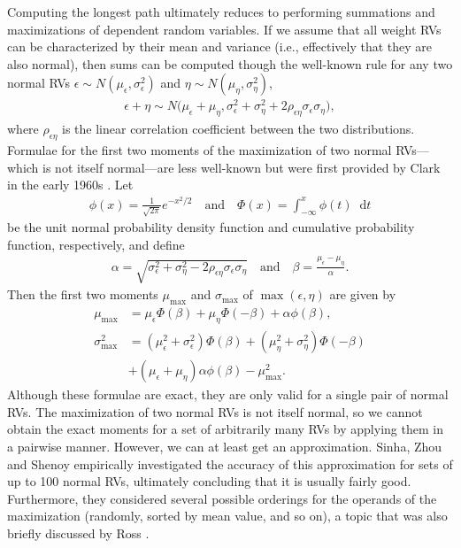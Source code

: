 \documentclass[12pt]{article}
\def\diff{\mathop{}\!\mathrm{d}}
\begin{document}
Computing the longest path ultimately reduces to performing summations and maximizations of dependent random variables. If we assume that all weight RVs can be characterized by their mean and variance (i.e., effectively that they are also normal), then sums can be computed though the well-known rule for any two normal RVs $\epsilon \sim N(\mu_\epsilon, \sigma_\epsilon^2)$ and $\eta \sim N(\mu_\eta, \sigma_\eta^2)$,
\begin{align}
\label{eq.sum_moments}
\epsilon + \eta \sim N \big(\mu_\epsilon + \mu_\eta, \sigma_\epsilon^2 + \sigma_\eta^2 + 2 \rho_{\epsilon\eta}\sigma_\epsilon \sigma_\eta \big), 
\end{align}
where $\rho_{\epsilon\eta}$ is the linear correlation coefficient between the two distributions. Formulae for the first two moments of the maximization of two normal RVs---which is not itself normal---are less well-known but were first provided by Clark in the early 1960s \cite{cla61}. Let 
\begin{align*}
\phi(x) = \frac{1}{\sqrt{2\pi}} e^{-x^2/2} \quad \text{and} \quad \Phi(x) = \int_{-\infty}^{x} \phi(t) \diff t
\end{align*}
be the unit normal probability density function and cumulative probability function, respectively, and define 
\begin{align}
  \label{eq.alpha_beta}
\alpha = \sqrt{\sigma_\epsilon^2 + \sigma_\eta^2 - 2 \rho_{\epsilon\eta}\sigma_\epsilon \sigma_\eta} \quad \text{and} \quad \beta = \frac{\mu_\epsilon - \mu_\eta}{\alpha}. 
\end{align}
Then the first two moments $\mu_{\max}$ and $\sigma_{\max}$ of $\max(\epsilon, \eta)$ are given by
\begin{align}
\mu_{\max} &= \mu_\epsilon \Phi(\beta) + \mu_\eta \Phi(-\beta) + \alpha \phi(\beta), \label{eq.clark_max_mu}\\
\sigma_{\max}^2 &= (\mu_\epsilon^2 + \sigma_\epsilon^2) \Phi(\beta) + (\mu_\eta^2 + \sigma_\eta^2) \Phi(-\beta) \label{eq.clark_max_sigma}\\
&+ (\mu_\epsilon + \mu_\eta)\alpha\phi(\beta) -\mu_{\max}^2 \nonumber.
\end{align}
Although these formulae are exact, they are only valid for a single pair of normal RVs. The maximization of two normal RVs is not itself normal, so we cannot obtain the exact moments for a set of arbitrarily many RVs by applying them in a pairwise manner. However, we can at least get an approximation. Sinha, Zhou and Shenoy \cite{sin07} empirically investigated the accuracy of this approximation for sets of up to 100 normal RVs, ultimately concluding that it is usually fairly good. Furthermore, they considered several possible orderings for the operands of the maximization (randomly, sorted by mean value, and so on), a topic that was also briefly discussed by Ross \cite{ross03}.        
\end{document}

